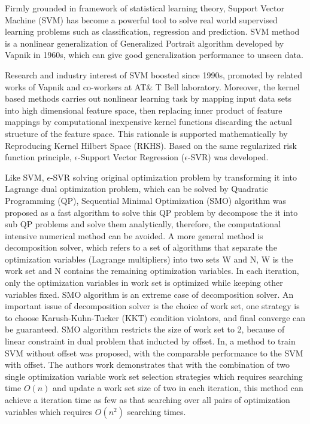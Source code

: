 \documentclass[12pt, draftclsnofoot, onecolumn]{IEEEtran}
\begin{document}
\begin{spacing}{2}
Firmly grounded in framework of statistical learning theory, Support Vector Machine (SVM) has become a powerful tool to solve real world supervised learning problems such as classification, regression and prediction. SVM method is a nonlinear generalization of Generalized Portrait algorithm developed by Vapnik in 1960s\cite{vapnik1963pattern}\cite{vapnik1964note}, which can give good generalization performance to unseen data\cite{scholkopf2002learning}.

Research and industry interest of SVM boosted since 1990s, promoted by related works of Vapnik and co-workers at AT\& T Bell laboratory\cite{boser1992training}\cite{guyon1993automatic}\cite{vapnik2013nature}\cite{cortes1995support}\cite{scholkopf1996incorporating}\cite{vapnik1996support}.
Moreover, the kernel based methods\cite{scholkopf2002learning} carries out nonlinear learning task by mapping input data sets into high dimensional feature space, then replacing inner product of feature mappings by computational inexpensive kernel functions discarding the actual structure of the feature space. This rationale is supported mathematically by Reproducing Kernel Hilbert Space (RKHS). 
Based on the same regularized risk function principle, $\epsilon$-Support Vector Regression ($\epsilon$-SVR) was developed\cite{vapnik2013nature}\cite{smola2004tutorial}.

Like SVM, $\epsilon$-SVR solving original optimization problem by transforming it into Lagrange dual optimization problem, which can be solved by Quadratic Programming (QP), Sequential Minimal Optimization (SMO) algorithm was proposed as a fast algorithm to solve this QP problem by decompose the it into sub QP problems and solve them analytically\cite{platt1999fast}, therefore, the computational intensive numerical method can be avoided. A more general method is decomposition solver, which refers to a set of algorithms that separate the optimization variables (Lagrange multipliers) into two sets W and N, W is the work set and N contains the remaining optimization variables. In each iteration, only the optimization variables in work set is optimized while keeping other variables fixed. SMO algorithm is an extreme case of decomposition solver. An important issue of decomposition solver is the choice of work set, one strategy is to choose Karush-Kuhn-Tucker (KKT) condition violators, and final converge can be guaranteed\cite{osuna1997improved}. SMO algorithm restricts the size of work set to 2, because of linear constraint in dual problem that inducted by offset. In\cite{steinwart2011training}, a method to train SVM without offset was proposed, with the comparable performance to the SVM with offset. The authors work demonstrates that with the combination of two single optimization variable work set selection strategies which requires searching time $O(n)$ and update a work set size of two in each iteration, this method can achieve a iteration time as few as that searching over all pairs of optimization variables which requires $O(n^{2})$ searching times.


\end{spacing}
\end{document}
